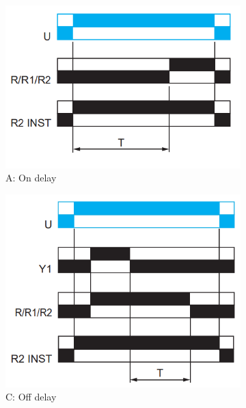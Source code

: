 \begin{figure}
	\centering
	\begin{subfigure}[b]{0.32\textwidth}
		\centering
		\includegraphics[width=\textwidth]{fig/A-OnDelay}
		\caption{A: On delay }
		\label{fig:on-delay}
	\end{subfigure}
	\begin{subfigure}[b]{0.32\textwidth}
		\centering
		\includegraphics[width=\textwidth]{fig/C-OffDelay}
		\caption{C: Off delay}
		\label{fig:Off-delay}
	\end{subfigure}
	\begin{subfigure}[b]{0.32\textwidth}
	\centering

\end{subfigure}
\end{figure}
